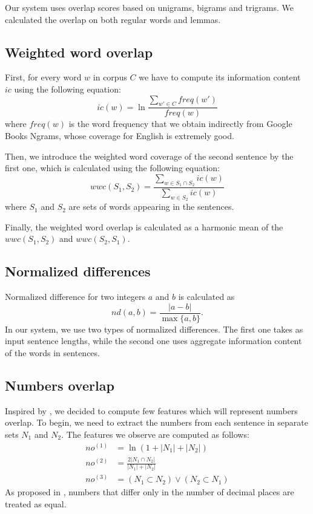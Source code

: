 \documentclass[10pt, a4paper]{article}
\begin{document}
Our system uses overlap scores based on unigrams, bigrams and trigrams. We calculated the overlap on both regular words and lemmas.

\subsection{Weighted word overlap}

First, for every word $w$ in corpus $C$ we have to compute its information content $ic$ using the following equation:
\begin{equation}
	ic(w) = \ln \frac{\sum_{w' \in C} freq(w')}{freq(w)}
\end{equation}
where $freq(w)$ is the word frequency that we obtain indirectly from Google Books Ngrams, whose coverage for English is extremely good. \citep{michel2011quantitative}

Then, we introduce the weighted word coverage of the second sentence by the first one, which is calculated using the following equation:
\begin{equation}
	wwc(S_1, S_2) = \frac{\sum_{w \in S_1 \cap S_2} ic(w)}{\sum_{w \in S_2} ic(w)}
\end{equation}
where $S_1$ and $S_2$ are sets of words appearing in the sentences.

Finally, the weighted word overlap is calculated as a harmonic mean of the $wwc(S_1,S_2)$ and $wwc(S_2,S_1)$.

\subsection{Normalized differences}

Normalized difference for two integers $a$ and $b$ is calculated as
\begin{equation}
	nd(a, b) = \frac{|a - b|}{\max \{a, b\}}.
\end{equation}
In our system, we use two types of normalized differences. The first one takes as input sentence lengths, while the second one uses aggregate information content of the words in sentences.

\subsection{Numbers overlap}

Inspired by \citep{socher2011dynamic}, we decided to compute few features which will represent numbers overlap. To begin, we need to extract the numbers from each sentence in separate sets $N_1$ and $N_2$.
The features we observe are computed as follows:
\begin{align}
	no^{(1)} &= \ln (1+|N_1|+|N_2|) \\
	no^{(2)} &= \frac{2 |N_1 \cap N_2|}{|N_1| + |N_2|} \\
	no^{(3)} &= (N_1 \subset N_2) \vee (N_2 \subset N_1)
\end{align}
As proposed in \citep{vsaric2012takelab}, numbers that differ only in the number of decimal places are treated as equal.
\end{document}
